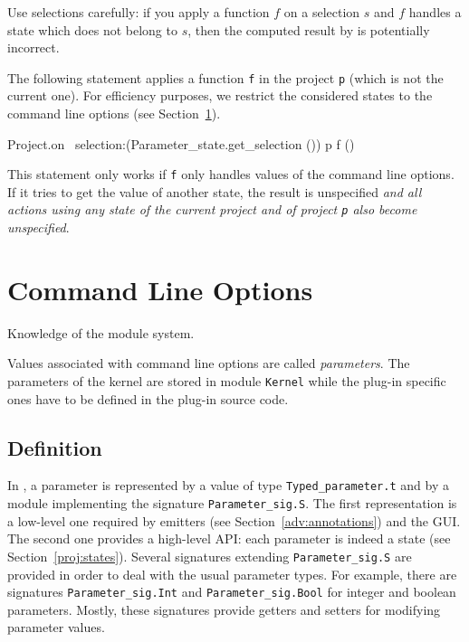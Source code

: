 \begin{important}
  Use selections carefully: if you apply a function $f$ on a selection $s$ and
  $f$ handles a state which does not belong to $s$, then the computed result by
  \framac is potentially incorrect.
\end{important}

\begin{example}
The following statement applies a function \texttt{f} in the project \texttt{p}
(which is not the current one). For efficiency purposes, we restrict the
considered states to the command line options (see Section~\ref{adv:cmdline}).
\begin{ocamlcode}
Project.on ~selection:(Parameter_state.get_selection ()) p f ()
\end{ocamlcode}
This statement only works if \texttt{f} only handles values of the command line
options. If it tries to get the value of another
state, the result is unspecified \emph{and all actions using any state of the
  current project and of project \texttt{p} also become
  unspecified}.
\end{example}


\section{Command Line Options}\label{adv:cmdline}

\begin{prereq}
  Knowledge of the \caml module system.
\end{prereq}

Values associated with command line options are called
\emph{parameters}. The parameters of the \framac kernel
are stored in module \texttt{Kernel} while the
plug-in specific ones have to be defined in the plug-in source
code.

\subsection{Definition}\label{options:definition}

In \framac, a parameter is represented by a value of type
\texttt{Typed\_parameter.t} and by a module
implementing the signature
\texttt{Parameter\_sig.S}. The first
representation is a low-level one required by emitters (see
Section~\ref{adv:annotations}) and the GUI. The second one provides a high-level
API: each parameter is indeed a state (see
Section~\ref{proj:states}).  Several signatures extending
\texttt{Parameter\_sig.S} are provided in order to deal with the usual parameter
types. For example, there are signatures
\texttt{Parameter\_sig.Int} and
\texttt{Parameter\_sig.Bool} for integer and
boolean parameters. Mostly, these signatures provide getters and setters for
modifying parameter values.

